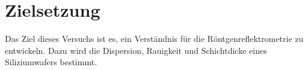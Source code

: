\section{Zielsetzung}
\label{sec:Zielsetzung}

Das Ziel dieses Versuchs ist es, ein Verständnis für die Röntgenreflektrometrie zu entwickeln.
Dazu wird die Dispersion, Rauigkeit und Schichtdicke eines Siliziumwafers bestimmt.
